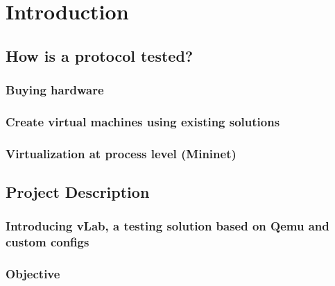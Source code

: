 \chapter{Introduction}
\label{chapter:intro}


\section{How is a protocol tested?}
\label{sec:proto-testing}


\subsection{Buying hardware}
\label{sub-sec:proto-testing-hardware}


\subsection{Create virtual machines using existing solutions}
\label{sub-sec:proto-testing-vms}


\subsection{Virtualization at process level (Mininet)}
\label{sub-sec:proto-testing-mininet}


\section{Project Description}
\label{sec:proj-desc}

\subsection{Introducing vLab, a testing solution based on Qemu and custom configs}
\label{sub-sec:proj-desc-intro}

\subsection{Objective}
\label{sub-sec:proj-desc-objective}


